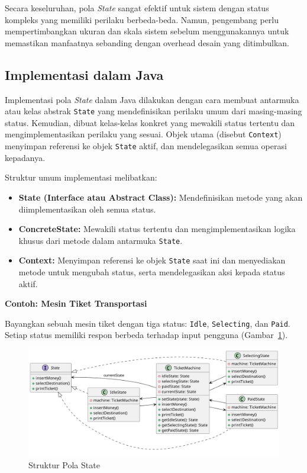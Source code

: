 Secara keseluruhan, pola \textit{State} sangat efektif untuk sistem dengan status kompleks yang memiliki perilaku berbeda-beda. Namun, pengembang perlu mempertimbangkan ukuran dan skala sistem sebelum menggunakannya untuk memastikan manfaatnya sebanding dengan overhead desain yang ditimbulkan.

\subsection{Implementasi dalam Java}

Implementasi pola \textit{State} dalam Java dilakukan dengan cara membuat antarmuka atau kelas abstrak \texttt{State} yang mendefinisikan perilaku umum dari masing-masing status. Kemudian, dibuat kelas-kelas konkret yang mewakili status tertentu dan mengimplementasikan perilaku yang sesuai. Objek utama (disebut \texttt{Context}) menyimpan referensi ke objek \texttt{State} aktif, dan mendelegasikan semua operasi kepadanya.

Struktur umum implementasi melibatkan:
\begin{itemize}
	\item \textbf{State (Interface atau Abstract Class):} Mendefinisikan metode yang akan diimplementasikan oleh semua status.
	\item \textbf{ConcreteState:} Mewakili status tertentu dan mengimplementasikan logika khusus dari metode dalam antarmuka \texttt{State}.
	\item \textbf{Context:} Menyimpan referensi ke objek \texttt{State} saat ini dan menyediakan metode untuk mengubah status, serta mendelegasikan aksi kepada status aktif.
\end{itemize}

\textbf{Contoh: Mesin Tiket Transportasi}

Bayangkan sebuah mesin tiket dengan tiga status: \texttt{Idle}, \texttt{Selecting}, dan \texttt{Paid}. Setiap status memiliki respon berbeda terhadap input pengguna (Gambar~\ref{fig:state}).

\begin{figure}[h]
	\centering
	\includegraphics[width=\textwidth]{../figures/out/state.png}
	\caption{Struktur Pola State}
	\label{fig:state}
\end{figure}


